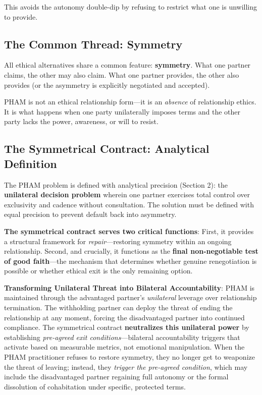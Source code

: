 \documentclass[12pt, letterpaper]{article}
\begin{document}
This avoids the autonomy double-dip by refusing to restrict what one is unwilling to provide.

\subsection{The Common Thread: Symmetry}

All ethical alternatives share a common feature: \textbf{symmetry}. What one partner claims, the other may also claim. What one partner provides, the other also provides (or the asymmetry is explicitly negotiated and accepted).

PHAM is not an ethical relationship form---it is an \textit{absence} of relationship ethics. It is what happens when one party unilaterally imposes terms and the other party lacks the power, awareness, or will to resist.

\subsection{The Symmetrical Contract: Analytical Definition}

The PHAM problem is defined with analytical precision (Section 2): the \textbf{unilateral decision problem} wherein one partner exercises total control over exclusivity and cadence without consultation. The solution must be defined with equal precision to prevent default back into asymmetry.

\textbf{The symmetrical contract serves two critical functions}: First, it provides a structural framework for \textit{repair}---restoring symmetry within an ongoing relationship. Second, and crucially, it functions as the \textbf{final non-negotiable test of good faith}---the mechanism that determines whether genuine renegotiation is possible or whether ethical exit is the only remaining option.

\textbf{Transforming Unilateral Threat into Bilateral Accountability}: PHAM is maintained through the advantaged partner's \textit{unilateral} leverage over relationship termination. The withholding partner can deploy the threat of ending the relationship at any moment, forcing the disadvantaged partner into continued compliance. The symmetrical contract \textbf{neutralizes this unilateral power} by establishing \textit{pre-agreed exit conditions}---bilateral accountability triggers that activate based on measurable metrics, not emotional manipulation. When the PHAM practitioner refuses to restore symmetry, they no longer get to weaponize the threat of leaving; instead, they \textit{trigger the pre-agreed condition}, which may include the disadvantaged partner regaining full autonomy or the formal dissolution of cohabitation under specific, protected terms.
\end{document}
